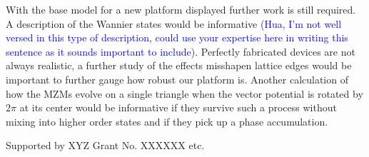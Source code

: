 \documentclass[aps,prb,showpacs,amsmath,amssymb,superscriptaddress]{revtex4-2}
\newcommand{\Blue}[1]{\textcolor{blue}{#1}}
\begin{document}
With the base model for a new platform displayed further work is still required.
A description of the Wannier states would be informative (\Blue{Hua, I'm not well versed in this type of description, could use your expertise here in writing this sentence as it sounds important to include}).
Perfectly fabricated devices are not always realistic, a further study of the effects misshapen lattice edges would be important to further gauge how robust our platform is.
Another calculation of how the MZMs evolve on a single triangle when the vector potential is rotated by $2\pi$ at its center would be informative if they survive such a process without mixing into higher order states and if they pick up a phase accumulation.

\begin{acknowledgements}
  Supported by XYZ Grant No. XXXXXX etc.
\end{acknowledgements}



\end{document}
